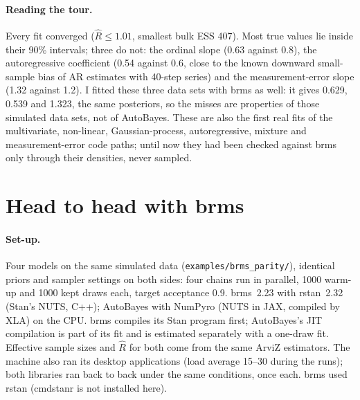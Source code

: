 \documentclass[11pt]{article}
\newcommand{\file}[1]{\texttt{#1}}
\begin{document}
\paragraph{Reading the tour.} Every fit converged ($\hat R \le 1.01$, smallest bulk ESS 407). Most true values lie inside
their 90\% intervals; three do not: the ordinal slope (0.63 against 0.8), the autoregressive coefficient (0.54
against 0.6, close to the known downward small-sample bias of AR estimates with 40-step series) and the
measurement-error slope (1.32 against 1.2). I fitted these three data sets with brms as well: it gives 0.629, 0.539 and
1.323, the same posteriors, so the misses are properties of those simulated data sets, not of AutoBayes. These are also
the first real fits of the multivariate, non-linear, Gaussian-process, autoregressive, mixture and measurement-error
code paths; until now they had been checked against brms only through their densities, never sampled.

\section{Head to head with brms}
\label{sec:bench}

\paragraph{Set-up.} Four models on the same simulated data (\file{examples/brms\_parity/}), identical priors and sampler
settings on both sides: four chains run in parallel, 1000 warm-up and 1000 kept draws each, target acceptance 0.9.
brms~2.23 with rstan~2.32 (Stan's NUTS, C++); AutoBayes with NumPyro (NUTS in JAX, compiled by XLA) on the CPU. brms
compiles its Stan program first; AutoBayes's JIT compilation is part of its fit and is estimated separately with a
one-draw fit. Effective sample sizes and $\hat R$ for both come from the same ArviZ estimators.
The machine also ran its desktop applications (load average 15--30 during the runs); both libraries ran
back to back under the same conditions, once each. brms used rstan (cmdstanr is not installed here).
\end{document}
